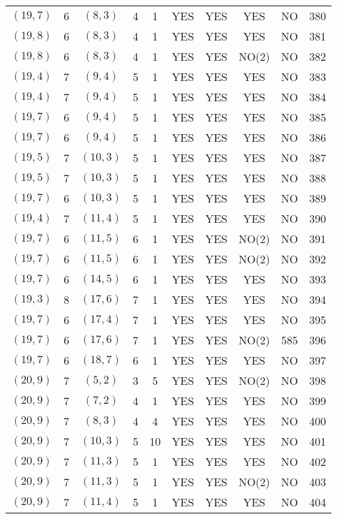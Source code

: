 \begin{longtable}{|c|c|c|c|c|c|c|c|c|c|}
$(19, 7)$ & 6 & $(8, 3)$ & 4 & 1 & YES & YES & YES & NO & 380\\
$(19, 8)$ & 6 & $(8, 3)$ & 4 & 1 & YES & YES & YES & NO & 381\\
$(19, 8)$ & 6 & $(8, 3)$ & 4 & 1 & YES & YES & NO(2) & NO & 382\\
$(19, 4)$ & 7 & $(9, 4)$ & 5 & 1 & YES & YES & YES & NO & 383\\
$(19, 4)$ & 7 & $(9, 4)$ & 5 & 1 & YES & YES & YES & NO & 384\\
$(19, 7)$ & 6 & $(9, 4)$ & 5 & 1 & YES & YES & YES & NO & 385\\
$(19, 7)$ & 6 & $(9, 4)$ & 5 & 1 & YES & YES & YES & NO & 386\\
$(19, 5)$ & 7 & $(10, 3)$ & 5 & 1 & YES & YES & YES & NO & 387\\
$(19, 5)$ & 7 & $(10, 3)$ & 5 & 1 & YES & YES & YES & NO & 388\\
$(19, 7)$ & 6 & $(10, 3)$ & 5 & 1 & YES & YES & YES & NO & 389\\
$(19, 4)$ & 7 & $(11, 4)$ & 5 & 1 & YES & YES & YES & NO & 390\\
$(19, 7)$ & 6 & $(11, 5)$ & 6 & 1 & YES & YES & NO(2) & NO & 391\\
$(19, 7)$ & 6 & $(11, 5)$ & 6 & 1 & YES & YES & NO(2) & NO & 392\\
$(19, 7)$ & 6 & $(14, 5)$ & 6 & 1 & YES & YES & YES & NO & 393\\
$(19, 3)$ & 8 & $(17, 6)$ & 7 & 1 & YES & YES & YES & NO & 394\\
$(19, 7)$ & 6 & $(17, 4)$ & 7 & 1 & YES & YES & YES & NO & 395\\
$(19, 7)$ & 6 & $(17, 6)$ & 7 & 1 & YES & YES & NO(2) & 585 & 396\\
$(19, 7)$ & 6 & $(18, 7)$ & 6 & 1 & YES & YES & YES & NO & 397\\
$(20, 9)$ & 7 & $(5, 2)$ & 3 & 5 & YES & YES & NO(2) & NO & 398\\
$(20, 9)$ & 7 & $(7, 2)$ & 4 & 1 & YES & YES & YES & NO & 399\\
$(20, 9)$ & 7 & $(8, 3)$ & 4 & 4 & YES & YES & YES & NO & 400\\
$(20, 9)$ & 7 & $(10, 3)$ & 5 & 10 & YES & YES & YES & NO & 401\\
$(20, 9)$ & 7 & $(11, 3)$ & 5 & 1 & YES & YES & YES & NO & 402\\
$(20, 9)$ & 7 & $(11, 3)$ & 5 & 1 & YES & YES & NO(2) & NO & 403\\
$(20, 9)$ & 7 & $(11, 4)$ & 5 & 1 & YES & YES & YES & NO & 404\\

\end{longtable}
